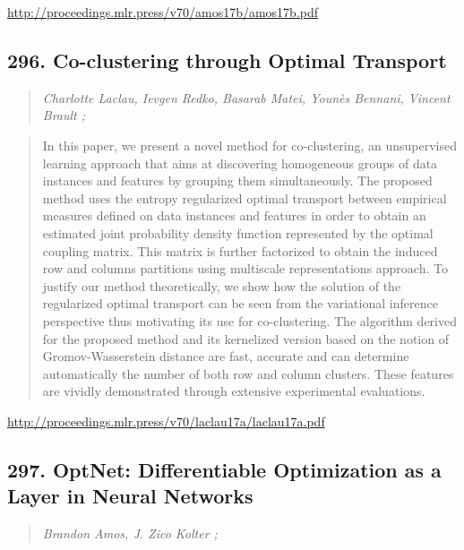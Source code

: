 \documentclass{article}
\begin{document}
\href{http://proceedings.mlr.press/v70/amos17b/amos17b.pdf}{http://proceedings.mlr.press/v70/amos17b/amos17b.pdf}

\subsection{296. Co-clustering through Optimal Transport}

\begin{quote}
\footnotesize{\textit{Charlotte Laclau, Ievgen Redko, Basarab Matei, Younès Bennani, Vincent Brault ;}}

\end{quote}

\begin{quote}
    In this paper, we present a novel method for co-clustering, an unsupervised learning approach that aims at discovering homogeneous groups of data instances and features by grouping them simultaneously. The proposed method uses the entropy regularized optimal transport between empirical measures defined on data instances and features in order to obtain an estimated joint probability density function represented by the optimal coupling matrix. This matrix is further factorized to obtain the induced row and columns partitions using multiscale representations approach. To justify our method theoretically, we show how the solution of the regularized optimal transport can be seen from the variational inference perspective thus motivating its use for co-clustering. The algorithm derived for the proposed method and its kernelized version based on the notion of Gromov-Wasserstein distance are fast, accurate and can determine automatically the number of both row and column clusters. These features are vividly demonstrated through extensive experimental evaluations.  
\end{quote}

\href{http://proceedings.mlr.press/v70/laclau17a/laclau17a.pdf}{http://proceedings.mlr.press/v70/laclau17a/laclau17a.pdf}

\subsection{297. OptNet: Differentiable Optimization as a Layer in Neural Networks}

\begin{quote}
\footnotesize{\textit{Brandon Amos, J. Zico Kolter ;}}

\end{quote}
\end{document}
